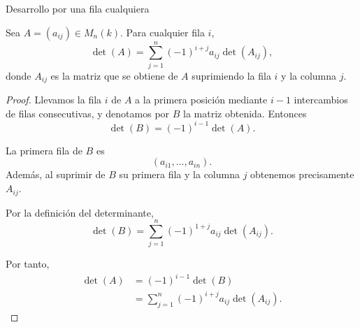 \begin{frame}[allowframebreaks]{Desarrollo por una fila cualquiera}

\begin{proposition}
Sea \(A=(a_{ij})\in M_n(k)\). Para cualquier fila \(i\),
\[
\det(A)
=
\sum_{j=1}^n
(-1)^{i+j}a_{ij}\det(A_{ij}),
\]
donde \(A_{ij}\) es la matriz que se obtiene de \(A\) suprimiendo
la fila \(i\) y la columna \(j\).
\end{proposition}

\begin{proof}
Llevamos la fila \(i\) de \(A\) a la primera posición mediante
\(i-1\) intercambios de filas consecutivas, y denotamos por \(B\)
la matriz obtenida. Entonces
\[
\det(B)=(-1)^{i-1}\det(A).
\]

La primera fila de \(B\) es
\[
(a_{i1},\ldots,a_{in}).
\]
Además, al suprimir de \(B\) su primera fila y la columna \(j\)
obtenemos precisamente \(A_{ij}\).

Por la definición del determinante,
\[
\det(B)
=
\sum_{j=1}^n
(-1)^{1+j}a_{ij}\det(A_{ij}).
\]

Por tanto,
\[
\begin{aligned}
\det(A)
&=
(-1)^{i-1}\det(B)\\
&=
\sum_{j=1}^n
(-1)^{i+j}a_{ij}\det(A_{ij}).
\end{aligned}
\]
\end{proof}

\end{frame}

